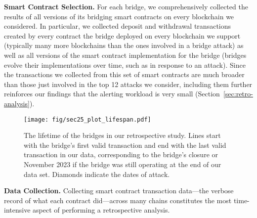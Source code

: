 \textbf{Smart Contract Selection.}
%
For each bridge, we comprehensively collected the results of all
versions of its bridging smart contracts on every blockchain we
considered.  In particular, we collected deposit and withdrawal
transactions created by every contract the bridge deployed on
every blockchain we support (typically many more blockchains than the
ones involved in a bridge attack) as well as all versions of the smart
contract implementation for the bridge (bridges evolve their
implementations over time, such as in response to an attack).
%
Since the transactions we collected from this set of smart contracts
are much broader than those just involved in the top 12 attacks we
consider, including them further reinforces our findings that the
alerting workload is very small (Section~\ref{sec:retro-analysis}).




\begin{figure}[t]
  \centering
  \texttt{[image: fig/sec25\_plot\_lifespan.pdf]}
  \caption[The Lifetime of Bridges in Our Study]{The lifetime of the bridges in our retrospective study.
    Lines start with the bridge's first valid transaction and end with the
    last valid transaction in our data, corresponding to the bridge's
    closure or November 2023 if the bridge was still operating at the
    end of our data set.  Diamonds indicate the dates of attack.}
  \label{fig:bridge-timeline}
\end{figure}


\textbf{Data Collection.}
Collecting smart contract transaction data---the verbose record of
what each contract did---across many chains constitutes the most
time-intensive aspect of performing a retrospective analysis.

